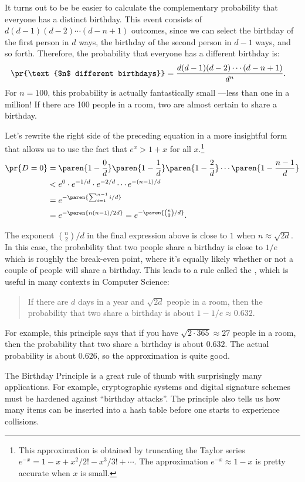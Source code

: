 It turns out to be be easier to calculate the complementary probability
that everyone has a distinct birthday.  This event consists of $d (d - 1)
(d - 2) \cdots (d - n + 1)$ outcomes, since we can select the birthday of
the first person in $d$ ways, the birthday of the second person in $d - 1$
ways, and so forth.  Therefore, the probability that everyone has a
different birthday is:
\begin{align*}
\pr{\text{$n$ different birthdays}} & = \frac{d (d - 1) (d - 2) \cdots (d - n + 1)}{d^n}.
\end{align*}
For $n=100$, this probability is actually fantastically small ---less
than one in a million!  If there are 100 people in a room, two are
almost certain to share a birthday.

Let's rewrite the right side of the preceding equation in a more
insightful form that allows us to use the fact that $e^x >1+x$ for all
$x$.\footnote{This approximation is obtained by truncating the Taylor
series $e^{-x} = 1 - x + x^2/2! - x^3/3! + \cdots$.  The approximation
$e^{-x} \approx 1 - x$ is pretty accurate when $x$ is small.}
\begin{align*}
\pr{D=0} & = \paren{1 - \frac{0}{d}}
             \paren{1 - \frac{1}{d}}
             \paren{1 - \frac{2}{d}}
             \cdots
             \paren{1 - \frac{n - 1}{d}}\\
       & < e^0 \cdot e^{-1/d} \cdot e^{-2/d} \cdots e^{-(n-1)/d} \\
       & = e^{-\paren{\sum_{i=1}^{n-1} i/d}}\\
       & = e^{-\paren{n(n-1)/2d}} = e^{-\paren{\binom{n}{2}/d}}.
\end{align*}

The exponent $\binom{n}{2}/d$ in the final expression above is close to
$1$ when $n \approx \sqrt{2d}$.  In this case, the probability that two
people share a birthday is close to $1/e$ which is roughly the break-even
point, where it's equally likely whether or not a couple of people will
share a birthday.  This leads to a rule called the , which is useful in many contexts in Computer Science:
\begin{quote}
If there are $d$ days in a year and $\sqrt{2d}$ people in a
room, then the probability that two share a birthday is about 
$1 - 1/e \approx 0.632$.
\end{quote}
For example, this principle says that if you have $\sqrt{2 \cdot 365}
\approx 27$ people in a room, then the probability that two share a
birthday is about $0.632$.  The actual probability is about $0.626$,
so the approximation is quite good.

The Birthday Principle is a great rule of thumb with surprisingly many
applications.  For example, cryptographic systems and digital signature
schemes must be hardened against ``birthday attacks''.  The principle also
tells us how many items can be inserted into a hash table before one
starts to experience collisions.

\endinput
